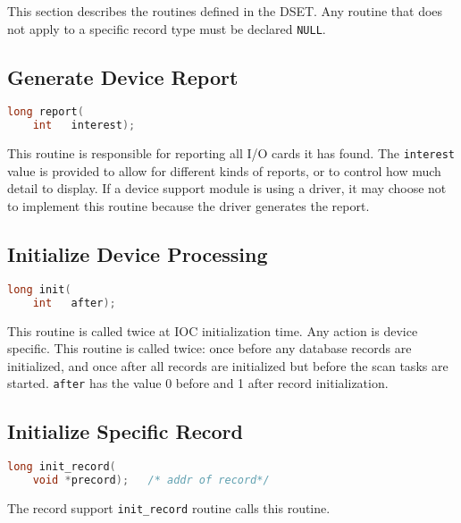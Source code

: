 This section describes the routines defined in the DSET.
Any routine that does not apply to a specific record type must be declared \verb|NULL|.

\subsection{Generate Device Report}

\begin{lstlisting}[language=C]
long report(
    int   interest);
\end{lstlisting}

This routine is responsible for reporting all I/O cards it has found.
The \verb|interest| value is provided to allow for different kinds of reports, or to control how much detail to display.
If a device support module is using a driver, it may choose not to implement this routine because the driver generates the report.

\subsection{Initialize Device Processing}
\label{subsec:Initialize Device Processing}

\begin{lstlisting}[language=C]
long init(
    int   after);
\end{lstlisting}

This routine is called twice at IOC initialization time.
Any action is device specific.
This routine is called twice: once before any database records are initialized, and once after all records are initialized but before the scan tasks are started.
\verb|after| has the value 0 before and 1 after record initialization.

\subsection{Initialize Specific Record}
\label{subsec:Initialize Specific Record}

\begin{lstlisting}[language=C]
long init_record(
    void *precord);   /* addr of record*/
\end{lstlisting}

The record support \verb|init_record| routine calls this routine.

